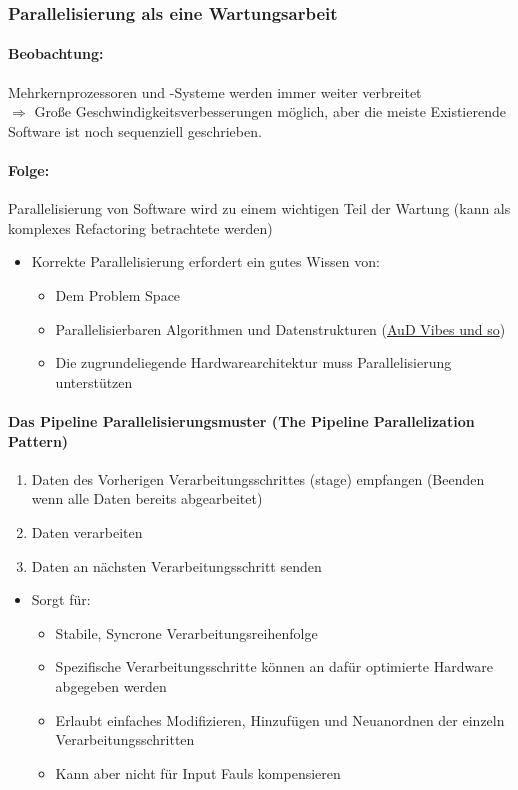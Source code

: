 \documentclass[ngerman,color=3b]{tuda_summary}
\begin{document}
\subsubsection{Parallelisierung als eine Wartungsarbeit}
\paragraph{Beobachtung:} Mehrkernprozessoren und -Systeme werden immer weiter verbreitet\\
$\Rightarrow$ Große Geschwindigkeitsverbesserungen möglich, aber die meiste Existierende Software ist noch sequenziell geschrieben.
\paragraph{Folge:} Parallelisierung von Software wird zu einem wichtigen Teil der Wartung (kann als komplexes Refactoring betrachtete werden)

\begin{itemize}
    \item Korrekte Parallelisierung erfordert ein gutes Wissen von:\begin{itemize}
              \item Dem Problem Space
              \item Parallelisierbaren Algorithmen und Datenstrukturen (\href{https://github.com/Rdeisenroth/AuD-Zusammenfassung/blob/master/AuD-Zusammenfassung-2020.pdf}{AuD Vibes und so})
              \item Die zugrundeliegende Hardwarearchitektur muss Parallelisierung unterstützen
          \end{itemize}
\end{itemize}
\paragraph{Das Pipeline Parallelisierungsmuster (The Pipeline Parallelization Pattern)}\begin{enumerate}
    \item Daten des Vorherigen Verarbeitungsschrittes (stage) empfangen (Beenden wenn alle Daten bereits abgearbeitet)
    \item Daten verarbeiten
    \item Daten an nächsten Verarbeitungsschritt senden
\end{enumerate}
\begin{itemize}
    \item Sorgt für:\begin{itemize}
              \item Stabile, Syncrone Verarbeitungsreihenfolge
              \item Spezifische Verarbeitungsschritte können an dafür optimierte Hardware abgegeben werden
              \item Erlaubt einfaches Modifizieren, Hinzufügen und Neuanordnen der einzeln Verarbeitungsschritten
              \item Kann aber nicht für Input Fauls kompensieren
          \end{itemize}
\end{itemize}
\clearpage
\end{document}
